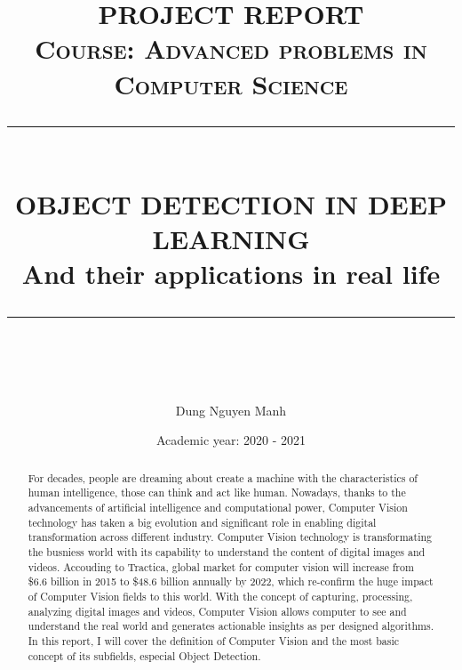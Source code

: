 \documentclass[12pt]{article}
\newcommand{\HRule}[1]{\rule{\linewidth}{#1}}
\begin{document}
\title{ \normalsize \textsc{PROJECT REPORT\\
    Course: Advanced problems in Computer Science}
\\ [5.0cm]
\HRule{0.5pt} \\
\LARGE \textbf{\uppercase{OBJECT DETECTION IN DEEP LEARNING}}
\\ [0.25 cm]
\large {And their applications in real life}
\HRule{2pt} \\ [0.5 cm]
\normalsize  \vspace*{5\baselineskip}}

\date{
    \large{Academic year: 2020 - 2021}
}

\author{
    Dung Nguyen Manh \\
}

\newpage
\maketitle

\sectionfont{\scshape}

\newpage
\tableofcontents
\newpage


\begin{abstract}
For decades, people are dreaming about create a machine with the characteristics
of human intelligence, those can think and act like human. Nowadays, thanks to the
advancements of artificial intelligence and computational power, Computer Vision
technology has taken a big evolution and significant role in enabling digital
transformation across different industry. Computer Vision technology is
transformating the busniess world with its capability to understand the content
of digital images and videos. Accouding to Tractica\cite{tracitareport}, global
market for computer vision will increase from \$6.6 billion in 2015 to \$48.6
billion annually by 2022, which re-confirm the huge impact of Computer Vision fields
to this world. With the concept of capturing, processing, analyzing digital images
and videos, Computer Vision allows computer to see and understand the real world and
generates actionable insights as per designed algorithms. In this report, I will cover
the definition of Computer Vision and the most basic concept of its subfields,
especial Object Detection.
\end{abstract}
\end{document}
